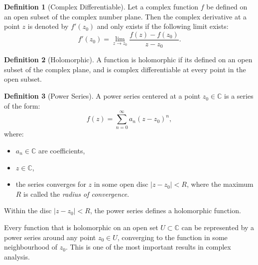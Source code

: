 \documentclass{article}
\theoremstyle{definition}
\newtheorem{definition}{Definition}[section]
\theoremstyle{definition}
\theoremstyle{definition}
\begin{document}
\begin{definition}[Complex Differentiable]
    Let a complex function $f$ be defined on an open subset of the complex number plane. Then the complex derivative at a point $z$ is denoted by $f'(z_0)$ and only exists if the following limit exists: $$f'(z_0)=\lim_{z\rightarrow z_0}\frac{f(z)-f(z_0)}{z-z_0}.$$ 
 
\end{definition}
\begin{definition}[Holomorphic]
    A function is holomorphic if its defined on an open subset of the complex plane, and is complex differentiable at every point in the open subset.
\end{definition}

\begin{definition}[Power Series]
    A power series centered at a point \( z_0 \in \mathbb{C} \) is a series of the form:
\[
f(z) = \sum_{n=0}^{\infty} a_n (z - z_0)^n,
\]
where:

\begin{itemize}
  \item \( a_n \in \mathbb{C} \) are coefficients,
  \item \( z \in \mathbb{C} \),
  \item the series converges for \( z \) in some open disc \( |z - z_0| < R \), where the maximum $R$ is called the \textit{radius of convergence}.
\end{itemize}

Within the disc \( |z - z_0| < R \), the power series defines a holomorphic function.

\end{definition}
Every function that is holomorphic on an open set \( U \subset \mathbb{C} \) can be represented by a power series around any point \( z_0 \in U \), converging to the function in some neighbourhood of \( z_0 \). This is one of the most important results in complex analysis. 
\end{document}
